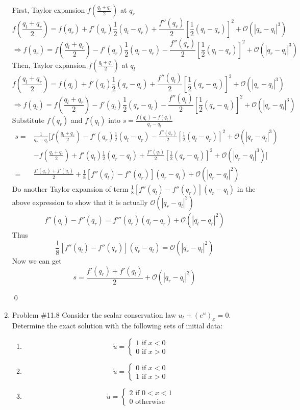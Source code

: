 \documentclass[11pt]{article}
\begin{document}
\begin{enumerate}
			First, Taylor expansion $f(\frac{q_l+q_r}{2})$ at $q_r$
			\[
			f(\frac{q_l+q_r}{2})=f(q_r)+f'(q_r)\frac{1}{2}(q_l-q_r)+\frac{f''(q_r)}{2}[\frac{1}{2}(q_l-q_r)]^2+\mathcal{O}(|q_r-q_l|^3)
			\]
			\[
			\Rightarrow 
			f(q_r) = f(\frac{q_l+q_r}{2})-f'(q_r)\frac{1}{2}(q_l-q_r)-\frac{f''(q_r)}{2}[\frac{1}{2}(q_l-q_r)]^2+\mathcal{O}(|q_r-q_l|^3)
			\]
			Then, Taylor expansion $f(\frac{q_l+q_r}{2})$ at $q_l$
			\[
			f(\frac{q_l+q_r}{2})=f(q_l)+f'(q_l)\frac{1}{2}(q_r-q_l)+\frac{f''(q_l)}{2}[\frac{1}{2}(q_r-q_l)]^2+\mathcal{O}(|q_r-q_l|^3)
			\]
			\[
			\Rightarrow 
			f(q_l)=f(\frac{q_l+q_r}{2})-f'(q_l)\frac{1}{2}(q_r-q_l)-\frac{f''(q_l)}{2}[\frac{1}{2}(q_r-q_l)]^2+\mathcal{O}(|q_r-q_l|^3)
			\]
			Substitute $f(q_r)$ and $f(q_l)$ into $s=\frac{f(q_r)-f(q_l)}{q_r-q_l}$
			\begin{align*}
			s=&\frac{1}{q_r-q_l}[f(\frac{q_l+q_r}{2})-f'(q_r)\frac{1}{2}(q_l-q_r)-\frac{f''(q_r)}{2}[\frac{1}{2}(q_l-q_r)]^2+\mathcal{O}(|q_r-q_l|^3)\\
			&-f(\frac{q_l+q_r}{2})+f'(q_l)\frac{1}{2}(q_r-q_l)+\frac{f''(q_l)}{2}[\frac{1}{2}(q_r-q_l)]^2+\mathcal{O}(|q_r-q_l|^3)]\\
			=&\frac{f'(q_r)+f'(q_l)}{2} + \frac{1}{8}[f''(q_l)-f''(q_r)](q_r-q_l)+\mathcal{O}(|q_r-q_l|^2)
			\end{align*}
			Do another Taylor expansion of term $\frac{1}{8}[f''(q_l)-f''(q_r)](q_r-q_l)$ in the above expression to show that it is actually $\mathcal{O}(|q_r-q_l|^2)$
			\begin{align*}
			f''(q_l)-f''(q_r) = f'''(q_r)(q_l-q_r)+\mathcal{O}(|q_l-q_r|^2)
			\end{align*}
			Thus 
			\[
			\frac{1}{8}[f''(q_l)-f''(q_r)](q_r-q_l)=\mathcal{O}(|q_r-q_l|^2)
			\]
			Now we can get
			\[
			s=\frac{f'(q_r)+f'(q_l)}{2}+\mathcal{O}(|q_r-q_l|^2)
			\]

\qed
\newpage  

    \item Problem \#11.8
    		Consider the scalar conservation law $u_t+(e^u)_x=0$. Determine the exact solution with the following sets of initial data:
    		\begin{enumerate}   		
			\item	
			\[\mathring{u}=\begin{cases}1\text{  if }x<0\\0\text{  if }x>0\end{cases}\] 				\item
			\[\mathring{u}=\begin{cases}0\text{  if }x<0\\1\text{  if }x>0\end{cases}\] 
			\item
			\[\mathring{u}=\begin{cases}2\text{  if }0<x<1\\0\text{  otherwise}\end{cases}\]  		
    		\end{enumerate}
    

\end{enumerate}
\end{document}
